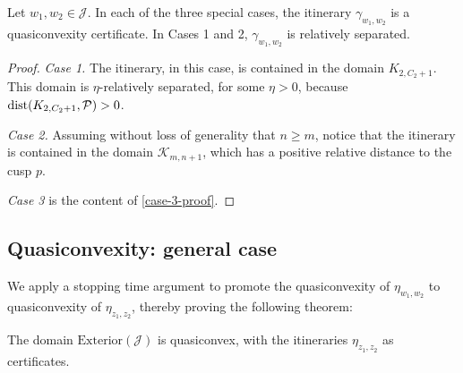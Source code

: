 \begin{lemma} \label{case 1 rel. sep}
Let $w_1,w_2 \in \mathcal J$. In each of the three special cases, the itinerary $\gamma _{w_1,w_2}$ is a quasiconvexity certificate. In Cases 1 and 2, $\gamma _{w_1,w_2}$ is relatively separated.
\end{lemma}

\begin{proof}
\emph{Case 1.} The itinerary, in this case, is contained in the domain $K_{2, C_2+1}$.
This domain is $\eta$-relatively separated, for some $\eta>0$, because $\operatorname{dist}(K_{2, C_2+1}, \mathcal P)>0$. 

\emph{Case 2.}
Assuming without loss of generality that $n \geq m$, notice that the itinerary is contained in the domain $\mathcal K_{m,n+1}$, which has a positive relative distance to the cusp $p$.

\emph{Case 3} is the content of \cref{case-3-proof}.
\end{proof}



\subsection{Quasiconvexity: general case}
We apply a stopping time argument to promote the quasiconvexity of $\eta_{w_1,w_2}$ to quasiconvexity of $\eta_{z_1,z_2}$, thereby proving the following theorem:

\begin{theorem} \label{quasiconvex-cauliflower}
	The domain $\mathrm{Exterior}(\mathcal{J})$ is quasiconvex, with the itineraries $\eta_{z_1,z_2}$ as certificates.
\end{theorem}


